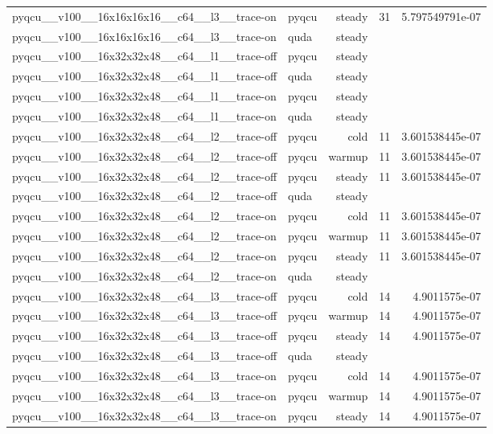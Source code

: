 \begin{table}[htbp]
\begin{tabular}{@{}llrrr@{}}
pyqcu\_\_v100\_\_16x16x16x16\_\_c64\_\_l3\_\_trace-on & pyqcu & steady & 31 & 5.797549791e-07 \\
pyqcu\_\_v100\_\_16x16x16x16\_\_c64\_\_l3\_\_trace-on & quda & steady &  &  \\
pyqcu\_\_v100\_\_16x32x32x48\_\_c64\_\_l1\_\_trace-off & pyqcu & steady &  &  \\
pyqcu\_\_v100\_\_16x32x32x48\_\_c64\_\_l1\_\_trace-off & quda & steady &  &  \\
pyqcu\_\_v100\_\_16x32x32x48\_\_c64\_\_l1\_\_trace-on & pyqcu & steady &  &  \\
pyqcu\_\_v100\_\_16x32x32x48\_\_c64\_\_l1\_\_trace-on & quda & steady &  &  \\
pyqcu\_\_v100\_\_16x32x32x48\_\_c64\_\_l2\_\_trace-off & pyqcu & cold & 11 & 3.601538445e-07 \\
pyqcu\_\_v100\_\_16x32x32x48\_\_c64\_\_l2\_\_trace-off & pyqcu & warmup & 11 & 3.601538445e-07 \\
pyqcu\_\_v100\_\_16x32x32x48\_\_c64\_\_l2\_\_trace-off & pyqcu & steady & 11 & 3.601538445e-07 \\
pyqcu\_\_v100\_\_16x32x32x48\_\_c64\_\_l2\_\_trace-off & quda & steady &  &  \\
pyqcu\_\_v100\_\_16x32x32x48\_\_c64\_\_l2\_\_trace-on & pyqcu & cold & 11 & 3.601538445e-07 \\
pyqcu\_\_v100\_\_16x32x32x48\_\_c64\_\_l2\_\_trace-on & pyqcu & warmup & 11 & 3.601538445e-07 \\
pyqcu\_\_v100\_\_16x32x32x48\_\_c64\_\_l2\_\_trace-on & pyqcu & steady & 11 & 3.601538445e-07 \\
pyqcu\_\_v100\_\_16x32x32x48\_\_c64\_\_l2\_\_trace-on & quda & steady &  &  \\
pyqcu\_\_v100\_\_16x32x32x48\_\_c64\_\_l3\_\_trace-off & pyqcu & cold & 14 & 4.9011575e-07 \\
pyqcu\_\_v100\_\_16x32x32x48\_\_c64\_\_l3\_\_trace-off & pyqcu & warmup & 14 & 4.9011575e-07 \\
pyqcu\_\_v100\_\_16x32x32x48\_\_c64\_\_l3\_\_trace-off & pyqcu & steady & 14 & 4.9011575e-07 \\
pyqcu\_\_v100\_\_16x32x32x48\_\_c64\_\_l3\_\_trace-off & quda & steady &  &  \\
pyqcu\_\_v100\_\_16x32x32x48\_\_c64\_\_l3\_\_trace-on & pyqcu & cold & 14 & 4.9011575e-07 \\
pyqcu\_\_v100\_\_16x32x32x48\_\_c64\_\_l3\_\_trace-on & pyqcu & warmup & 14 & 4.9011575e-07 \\
pyqcu\_\_v100\_\_16x32x32x48\_\_c64\_\_l3\_\_trace-on & pyqcu & steady & 14 & 4.9011575e-07 \\

\end{tabular}
\end{table}
